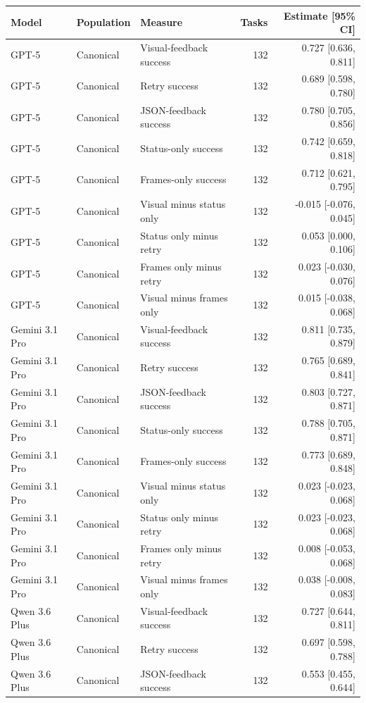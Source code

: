 \begin{tabular}{lllrr}
\toprule
Model & Population & Measure & Tasks & Estimate [95\% CI] \\
\midrule
GPT-5 & Canonical & Visual-feedback success & 132 & 0.727 [0.636, 0.811] \\
GPT-5 & Canonical & Retry success & 132 & 0.689 [0.598, 0.780] \\
GPT-5 & Canonical & JSON-feedback success & 132 & 0.780 [0.705, 0.856] \\
GPT-5 & Canonical & Status-only success & 132 & 0.742 [0.659, 0.818] \\
GPT-5 & Canonical & Frames-only success & 132 & 0.712 [0.621, 0.795] \\
GPT-5 & Canonical & Visual minus status only & 132 & -0.015 [-0.076, 0.045] \\
GPT-5 & Canonical & Status only minus retry & 132 & 0.053 [0.000, 0.106] \\
GPT-5 & Canonical & Frames only minus retry & 132 & 0.023 [-0.030, 0.076] \\
GPT-5 & Canonical & Visual minus frames only & 132 & 0.015 [-0.038, 0.068] \\
Gemini 3.1 Pro & Canonical & Visual-feedback success & 132 & 0.811 [0.735, 0.879] \\
Gemini 3.1 Pro & Canonical & Retry success & 132 & 0.765 [0.689, 0.841] \\
Gemini 3.1 Pro & Canonical & JSON-feedback success & 132 & 0.803 [0.727, 0.871] \\
Gemini 3.1 Pro & Canonical & Status-only success & 132 & 0.788 [0.705, 0.871] \\
Gemini 3.1 Pro & Canonical & Frames-only success & 132 & 0.773 [0.689, 0.848] \\
Gemini 3.1 Pro & Canonical & Visual minus status only & 132 & 0.023 [-0.023, 0.068] \\
Gemini 3.1 Pro & Canonical & Status only minus retry & 132 & 0.023 [-0.023, 0.068] \\
Gemini 3.1 Pro & Canonical & Frames only minus retry & 132 & 0.008 [-0.053, 0.068] \\
Gemini 3.1 Pro & Canonical & Visual minus frames only & 132 & 0.038 [-0.008, 0.083] \\
Qwen 3.6 Plus & Canonical & Visual-feedback success & 132 & 0.727 [0.644, 0.811] \\
Qwen 3.6 Plus & Canonical & Retry success & 132 & 0.697 [0.598, 0.788] \\
Qwen 3.6 Plus & Canonical & JSON-feedback success & 132 & 0.553 [0.455, 0.644] \\

\end{tabular}
